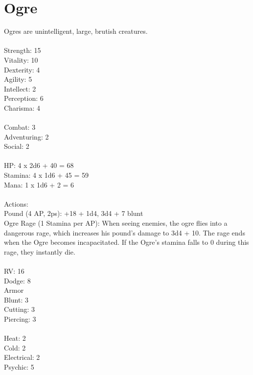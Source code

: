 \section{Ogre}

Ogres are unintelligent, large, brutish creatures.\\
\\
Strength: 15\\
Vitality: 10\\
Dexterity: 4\\
Agility: 5\\
Intellect: 2\\
Perception: 6\\
Charisma: 4\\
\\
Combat: 3\\
Adventuring: 2\\
Social: 2\\
\\
HP: 4 x 2d6 + 40 = 68\\
Stamina: 4 x 1d6 + 45 = 59\\
Mana: 1 x 1d6 + 2 = 6\\
\\
Actions:\\
Pound (4 AP, 2ps): +18 + 1d4, 3d4 + 7 blunt\\
Ogre Rage (1 Stamina per AP): When seeing enemies, the ogre flies into a dangerous rage, which increases his pound's damage to 3d4 + 10.
The rage ends when the Ogre becomes incapacitated.
If the Ogre's stamina falls to 0 during this rage, they instantly die.\\
\\
RV: 16\\
Dodge: 8\\
Armor\\
Blunt: 3\\
Cutting: 3\\
Piercing: 3\\
\\
Heat: 2\\
Cold: 2\\
Electrical: 2\\
Psychic: 5\\